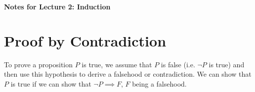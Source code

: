 \documentclass[11pt]{article}
\theoremstyle{definition}
\begin{document}
\thispagestyle{firstpage}

\vspace*{0cm} %

\begin{center}
    \Large \textbf{Notes for Lecture 2: Induction}
\end{center}

\vspace{1cm} %

\section{Proof by Contradiction}
To prove a proposition \( P \) is true, we assume that \( P \) is false (i.e. \( \neg P \) is true) and then use this hypothesis to derive a falsehood or contradiction. We can show that \( P \) is true if we can show that \( \neg P \implies F \), \( F \) being a falsehood.
\end{document}
